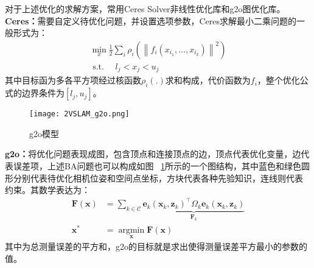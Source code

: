 对于上述优化的求解方案，常用Ceres Solver非线性优化库和g2o图优化库。
\textbf{Ceres：}需要自定义待优化问题，并设置选项参数，Ceres求解最小二乘问题的一般形式为：
\begin{equation}
  \begin{array}{ll}{\min _{x} \frac{1}{2} \sum_{i} \rho_{i}\left(\left\|f_{i}\left(x_{i_{1}}, \ldots, x_{i_{k}}\right)\right\|^{2}\right)} \\ {\text { s.t. } \quad l_{j}<x_{j}<u_{j}}\end{array}
\end{equation}
其中目标函为多各平方项经过核函数$\rho_{i}(.)$求和构成，代价函数为$f_i$，整个优化公式的边界条件为$[l_j,u_j]$。
\begin{figure}[H] %
  \centering
  \texttt{[image: 2VSLAM\_g2o.png]}
  \caption{g2o模型}
  \label{fig:2VSLAM_g2o}
\end{figure}
\textbf{g2o：}将优化问题表现成图，包含顶点和连接顶点的边，顶点代表优化变量，边代表误差项，上述BA问题也可以构成如图
~\ref{fig:2VSLAM_g2o}所示的一个图结构，其中蓝色和绿色圆形分别代表待优化相机位姿和空间点坐标，方块代表各种先验知识，连线则代表
约束。其数学表达为：
\begin{equation}
  \begin{aligned} \mathbf{F}(\mathbf{x}) &=\sum_{k \in \mathcal{C}} \underbrace{\mathbf{e}_{k}\left(\mathbf{x}_{k}, \mathbf{z}_{k}\right)^{\top} \Omega_{k} \mathbf{e}_{k}\left(\mathbf{x}_{k}, \mathbf{z}_{k}\right)}_{\mathbf{F}_{k}} \\ \mathbf{x}^{*} &=\underset{\mathbf{x}}{\operatorname{argmin}} \mathbf{F}(\mathbf{x}) \end{aligned}
\end{equation}
其中为总测量误差的平方和，g2o的目标就是求出使得测量误差平方最小的参数的值。
